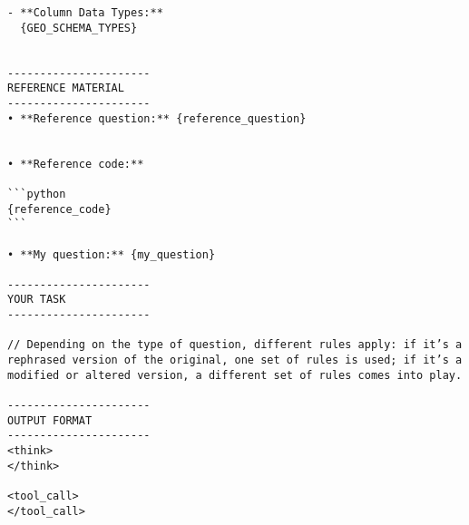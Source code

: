 \begin{lstlisting}[style=customprompt,caption={Prompt for synthetic code generation},label={prompt:synthetic_code_generation}]
- **Column Data Types:**
  {GEO_SCHEMA_TYPES}


----------------------
REFERENCE MATERIAL
----------------------
• **Reference question:** {reference_question}


• **Reference code:**

```python
{reference_code}
```

• **My question:** {my_question}

----------------------
YOUR TASK
----------------------

// Depending on the type of question, different rules apply: if it’s a rephrased version of the original, one set of rules is used; if it’s a modified or altered version, a different set of rules comes into play.

----------------------
OUTPUT FORMAT
----------------------
<think>
</think>

<tool_call>
</tool_call>

\end{lstlisting}

